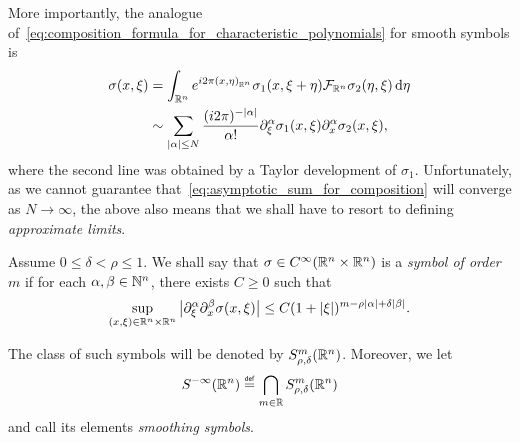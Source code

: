 More importantly,
the analogue of~\eqref{eq:composition_formula_for_characteristic_polynomials} for smooth symbols is
\begin{align}
    \sigma(x, \xi)
    &= \int_{\R^n} \e^{\i \turn \ip [\R^n] x \eta} \sigma_1(x, \xi + \eta) \Fourier [\R^n] \sigma_2(\eta, \xi) \dd \eta \notag\\
    &\sim \sum_{\abs \alpha \leq N} \frac {(\i \turn)^{-\abs \alpha}} {\alpha!} \iD{\xi^\alpha} \sigma_1(x, \xi) \iD{x^\alpha} \sigma_2(x, \xi),
    \label{eq:asymptotic_sum_for_composition}
\end{align}
where the second line was obtained by a Taylor development of $\sigma_1$.
Unfortunately,
as we cannot guarantee that~\eqref{eq:asymptotic_sum_for_composition} will converge as $N \to \infty$,
the above also means that we shall have to resort to defining \emph{approximate limits}.

\begin{definition}
    Assume $0 \leq \delta < \rho \leq 1$.
    We shall say that $\sigma \in \SmoothFunctions {\R^n \times \R^n}$ is a \emph{symbol of order $m$}
    if for each $\alpha, \beta \in \N^n$,
    there exists $C \geq 0$ such that
    \begin{align*}
        \sup_{(x, \xi) \in \R^n \times \R^n} \abs {\iD{\xi^\alpha} \iD{x^\beta}\sigma(x, \xi)} \leq C (1 + \abs \xi)^{m - \rho \abs \alpha + \delta \abs \beta}.
    \end{align*}

    The class of such symbols will be denoted by $\SymbolClass [\R^n] m {\rho, \delta}$.
    Moreover, we let
    \begin{align*}
        \SmoothingSymbols [\R^n] \defeq \bigcap_{m \in \R} \SymbolClass [\R^n] m {\rho, \delta}
    \end{align*}
    and call its elements \emph{smoothing symbols}.
\end{definition}

